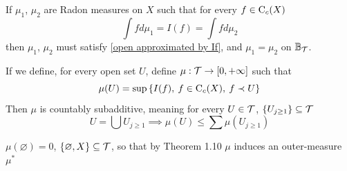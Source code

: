 \documentclass[../../main.tex]{subfiles}
\begin{document}
\begin{enumalpha}
    \item If $\mu_1$, $\mu_2$ are Radon measures on $X$ such that for every $f\in\operatorname{C}_c({X})$
    \[
    \int fd\mu_1=I(f)=\int fd\mu_2
    \]
    then $\mu_1$, $\mu_2$ must satisfy \eqref{open approximated by If}, and $\mu_1 =\mu_2$ on $\mathbb{B}_{\mathcal{T}}$.
    \label{7.2.a}
%
%
    \item If we define, for every open set $U$, define $\mu:\mathcal{T}\to[0,+\infty]$ such that
    \begin{equation}\label{mu definition on open sets}
    \mu(U) = \sup\left\{I(f),\:f\in\operatorname{C}_c({X}),\:f\prec U\right\}
    \end{equation}
    Then $\mu$ is countably subadditive, meaning for every $U\in\mathcal{T}$, $\{U_{j\geq 1}\}\subseteq \mathcal{T}$
    \[
    U = \bigcup U_{j\geq 1}\implies \mu(U)\leq \sum\mu(U_{j\geq 1})
    \]\label{7.2.b}
%
%
    \item $\mu(\varnothing)=0$, $\{\varnothing, X\}\subseteq \mathcal{T}$, so that by Theorem 1.10 $\mu$ induces an outer-measure $\mu^*$
    

\end{enumalpha}
\end{document}
